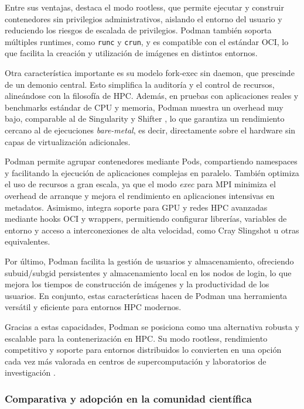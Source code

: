 Entre sus ventajas, destaca el modo rootless, que permite ejecutar y construir contenedores sin privilegios administrativos, aislando el entorno del usuario y reduciendo los riesgos de escalada de privilegios. Podman también soporta múltiples runtimes, como \texttt{runc} y \texttt{crun}, y es compatible con el estándar OCI, lo que facilita la creación y utilización de imágenes en distintos entornos.

Otra característica importante es su modelo fork-exec sin daemon, que prescinde de un demonio central. Esto simplifica la auditoría y el control de recursos, alineándose con la filosofía de \acs{HPC}. Además, en pruebas con aplicaciones reales y benchmarks estándar de CPU y memoria, Podman muestra un overhead muy bajo, comparable al de Singularity y Shifter \cite{gantikow2020rootless, stephey2022scaling}, lo que garantiza un rendimiento cercano al de ejecuciones \textit{bare-metal}, es decir, directamente sobre el hardware sin capas de virtualización adicionales.

Podman permite agrupar contenedores mediante Pods, compartiendo namespaces y facilitando la ejecución de aplicaciones complejas en paralelo. También optimiza el uso de recursos a gran escala, ya que el modo \textit{exec} para MPI minimiza el overhead de arranque y mejora el rendimiento en aplicaciones intensivas en metadatos. Asimismo, integra soporte para GPU y redes \acs{HPC} avanzadas mediante hooks OCI y wrappers, permitiendo configurar librerías, variables de entorno y acceso a interconexiones de alta velocidad, como Cray Slingshot u otras equivalentes.

Por último, Podman facilita la gestión de usuarios y almacenamiento, ofreciendo subuid/subgid persistentes y almacenamiento local en los nodos de login, lo que mejora los tiempos de construcción de imágenes y la productividad de los usuarios. En conjunto, estas características hacen de Podman una herramienta versátil y eficiente para entornos \acs{HPC} modernos.

Gracias a estas capacidades, Podman se posiciona como una alternativa robusta y escalable para la contenerización en \acs{HPC}. Su modo rootless, rendimiento competitivo y soporte para entornos distribuidos lo convierten en una opción cada vez más valorada en centros de supercomputación y laboratorios de investigación \cite{gantikow2020rootless, stephey2022scaling}.

\subsubsection{Comparativa y adopción en la comunidad científica}

